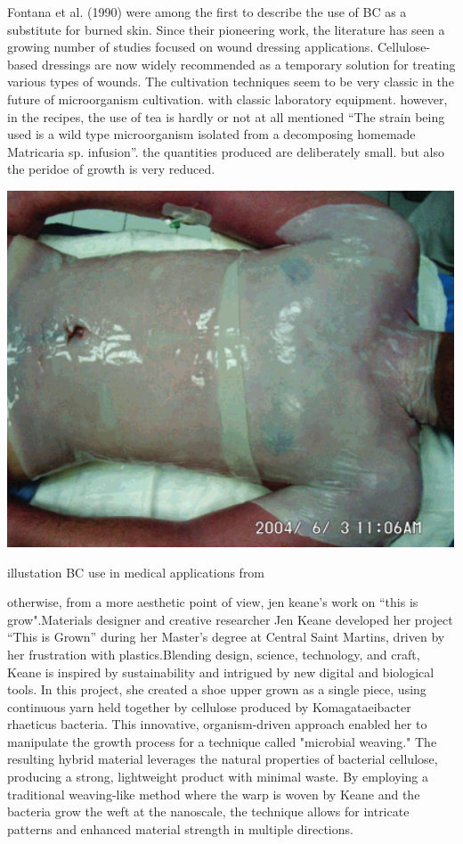 Fontana et al. (1990)\cite{fontana1990acetobacter} were among the first to describe the use of BC as a substitute for burned skin. Since their pioneering work, the literature has seen a growing number of studies focused on wound dressing applications. Cellulose-based dressings are now widely recommended as a temporary solution for treating various types of wounds.\cite{de2016multipurpose} 
The cultivation techniques seem to be very classic in the future of microorganism cultivation. with classic laboratory equipment. however, in the recipes, the use of tea is hardly or not at all mentioned “The strain being used is a wild type microorganism isolated from a
decomposing homemade Matricaria sp. infusion”\cite{fontana1990acetobacter}. the quantities produced are deliberately small. but also the peridoe of growth is very reduced. 

\begin{marginfigure}
    \centering
    \includegraphics{images/medical_appl.png}    
    \caption{illustation BC use in medical applications from \cite{czaja2007future}}
    \label{fig:medical applications}
\end{marginfigure}

otherwise, from a more aesthetic point of view, jen keane's work on “this is grow".Materials designer and creative researcher Jen Keane developed her project “This is Grown” during her Master’s degree at Central Saint Martins, driven by her frustration with plastics.Blending design, science, technology, and craft, Keane is inspired by sustainability and intrigued by new digital and biological tools. In this project, she created a shoe upper grown as a single piece, using continuous yarn held together by cellulose produced by Komagataeibacter rhaeticus bacteria. This innovative, organism-driven approach enabled her to manipulate the growth process for a technique called "microbial weaving." 
The resulting hybrid material leverages the natural properties of bacterial cellulose, producing a strong, lightweight product with minimal waste. By employing a traditional weaving-like method where the warp is woven by Keane and the bacteria grow the weft at the nanoscale, the technique allows for intricate patterns and enhanced material strength in multiple directions.

